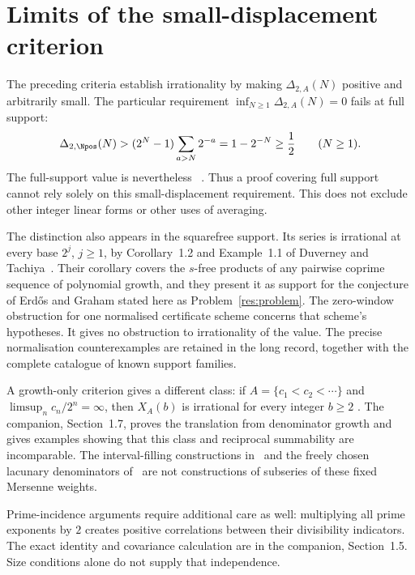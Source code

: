 \documentclass[11pt]{article}
\begin{document}
\section{Limits of the small-displacement criterion}\label{sec:map}
The preceding criteria establish irrationality by making
$\Delta_{2,A}(N)$ positive and arbitrarily small.  The particular
requirement $\inf_{N\ge1}\Delta_{2,A}(N)=0$ fails at full support:
\[
 \Delta_{2,\Npos}(N)
 >(2^N-1)\sum_{a>N}2^{-a}=1-2^{-N}\ge\frac12
 \qquad(N\ge1).
\]
The full-support value is nevertheless
~\cite{erdos1948}.
Thus a proof covering full support cannot rely solely on this
small-displacement requirement.  This does not exclude other
integer linear forms or other uses of averaging.

The distinction also appears in the squarefree support.  Its series is
irrational at every base $2^j$, $j\ge1$, by Corollary~1.2 and Example~1.1
of Duverney and Tachiya~\cite[p.~4]{duverneytachiya}.  Their corollary
covers the $s$-free products of any pairwise coprime sequence of polynomial
growth, and they present it as support for the conjecture of Erd\H{o}s and
Graham stated here as Problem~\ref{res:problem}.
The zero-window obstruction for one normalised certificate scheme concerns
that scheme's hypotheses.  It gives no obstruction to irrationality of the
value.  The precise normalisation counterexamples are retained in the
long record, together with the complete catalogue of known support families.

A growth-only criterion gives a different class: if
$A=\{c_1<c_2<\cdots\}$ and $\limsup_n c_n/2^n=\infty$, then
$X_A(b)$ is irrational for every integer $b\ge2$
\cite[Theorem~1]{erdos1975}.  The companion, Section~1.7,
proves the translation from denominator growth and gives examples
showing that this class and reciprocal summability are incomparable.
The interval-filling constructions in~\cite{bkkkz2026} and the
freely chosen lacunary denominators of~\cite{vandoornkovac} are not
constructions of subseries of these fixed Mersenne weights.

Prime-incidence arguments require additional care as well: multiplying
all prime exponents by $2$ creates positive correlations between their
divisibility indicators.  The exact identity and covariance calculation
are in the companion, Section~1.5.  Size conditions alone do not
supply that independence.
\end{document}
